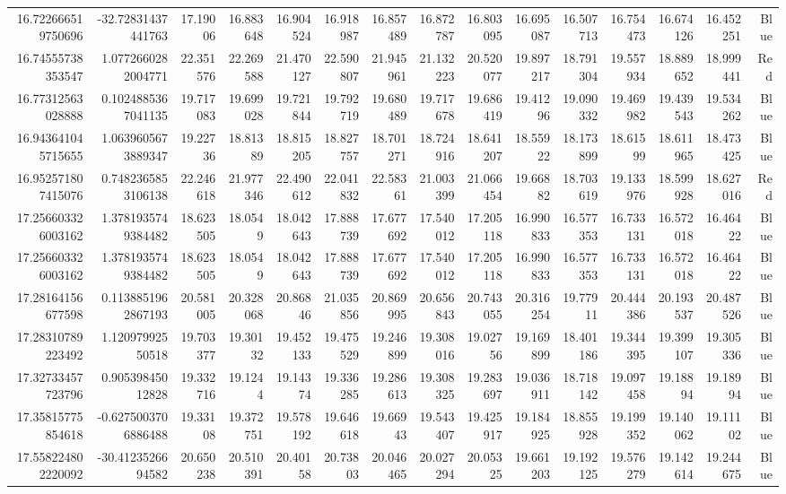 \begin{center}
\begin{longtable}{rrrrrrrrrrrrrrr}
16.722666519750696 & -32.72831437441763 & 17.19006 & 16.883648 & 16.904524 & 16.918987 & 16.857489 & 16.872787 & 16.803095 & 16.695087 & 16.507713 & 16.754473 & 16.674126 & 16.452251 & Blue \\
16.74555738353547 & 1.0772660282004771 & 22.351576 & 22.269588 & 21.470127 & 22.590807 & 21.945961 & 21.132223 & 20.520077 & 19.897217 & 18.791304 & 19.557934 & 18.889652 & 18.999441 & Red \\
16.77312563028888 & 0.1024885367041135 & 19.717083 & 19.699028 & 19.721844 & 19.792719 & 19.680489 & 19.717678 & 19.686419 & 19.41296 & 19.090332 & 19.469982 & 19.439543 & 19.534262 & Blue \\
16.943641045715655 & 1.0639605673889347 & 19.22736 & 18.81389 & 18.815205 & 18.827757 & 18.701271 & 18.724916 & 18.641207 & 18.55922 & 18.173899 & 18.61599 & 18.611965 & 18.473425 & Blue \\
16.952571807415076 & 0.7482365853106138 & 22.246618 & 21.977346 & 22.490612 & 22.041832 & 22.58361 & 21.003399 & 21.066454 & 19.66882 & 18.703619 & 19.133976 & 18.599928 & 18.627016 & Red \\
17.256603326003162 & 1.3781935749384482 & 18.623505 & 18.0549 & 18.042643 & 17.888739 & 17.677692 & 17.540012 & 17.205118 & 16.990833 & 16.577353 & 16.733131 & 16.572018 & 16.46422 & Blue \\
17.256603326003162 & 1.3781935749384482 & 18.623505 & 18.0549 & 18.042643 & 17.888739 & 17.677692 & 17.540012 & 17.205118 & 16.990833 & 16.577353 & 16.733131 & 16.572018 & 16.46422 & Blue \\
17.28164156677598 & 0.1138851962867193 & 20.581005 & 20.328068 & 20.86846 & 21.035856 & 20.869995 & 20.656843 & 20.743055 & 20.316254 & 19.77911 & 20.444386 & 20.193537 & 20.487526 & Blue \\
17.28310789223492 & 1.12097992550518 & 19.703377 & 19.30132 & 19.452133 & 19.475529 & 19.246899 & 19.308016 & 19.02756 & 19.169899 & 18.401186 & 19.344395 & 19.399107 & 19.305336 & Blue \\
17.32733457723796 & 0.90539845012828 & 19.332716 & 19.1244 & 19.14374 & 19.336285 & 19.286613 & 19.308325 & 19.283697 & 19.036911 & 18.718142 & 19.097458 & 19.18894 & 19.18994 & Blue \\
17.35815775854618 & -0.6275003706886488 & 19.33108 & 19.372751 & 19.578192 & 19.646618 & 19.66943 & 19.543407 & 19.425917 & 19.184925 & 18.855928 & 19.199352 & 19.140062 & 19.11102 & Blue \\
17.558224802220092 & -30.4123526694582 & 20.650238 & 20.510391 & 20.40158 & 20.73803 & 20.046465 & 20.027294 & 20.05325 & 19.661203 & 19.192125 & 19.576279 & 19.142614 & 19.244675 & Blue \\

\end{longtable}
\end{center}
